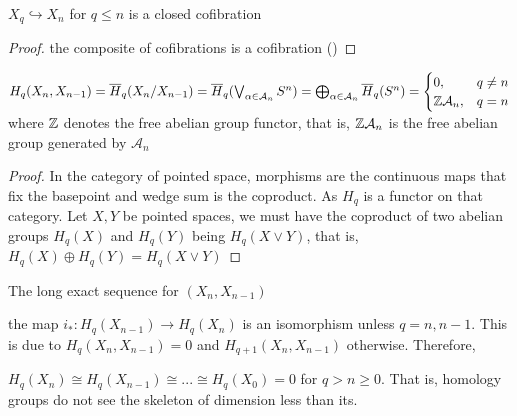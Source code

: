 \documentclass{report}
\begin{document}
\begin{corollary}
    $X_q \hookrightarrow X_n$ for $q \leq n$ is a closed cofibration
\end{corollary}

\begin{proof}
    the composite of cofibrations is a cofibration ()
\end{proof}

\begin{corollary}
    $H_q(X_n, X_{n-1}) = \overline{H}_q(X_n / X_{n-1}) = \overline{H}_q(\bigvee_{\alpha \in \mathcal{A}_n} S^n) = \bigoplus_{\alpha \in \mathcal{A}_n} \overline{H}_q (S^n) = \begin{cases}
        0, &q \neq n \\
        \mathbb{Z} \mathcal{A}_n, &q = n \\
    \end{cases}$
    where $\mathbb{Z}$ denotes the free abelian group functor, that is, $\mathbb{Z} \mathcal{A}_n$ is the free abelian group generated by $\mathcal{A}_n$
\end{corollary}

\begin{proof}
    In the category of pointed space, morphisms are the continuous maps that fix the basepoint and wedge sum is the coproduct. As $H_q$ is a functor on that category. Let $X, Y$ be pointed spaces, we must have the coproduct of two abelian groups $H_q(X)$ and $H_q(Y)$ being $H_q(X \vee Y)$, that is, $H_q(X) \oplus H_q(Y) = H_q(X \vee Y)$
\end{proof}

The long exact sequence for $(X_n, X_{n-1})$ 

\begin{center}
\end{center}

the map $i_*: H_q(X_{n-1}) \to H_q(X_n)$ is an isomorphism unless $q = n, n-1$. This is due to $H_q(X_n, X_{n-1}) = 0$ and $H_{q+1}(X_n, X_{n-1})$ otherwise. Therefore,

\begin{corollary}
    $H_q(X_n) \cong H_q(X_{n-1}) \cong ... \cong H_q(X_0) = 0$ for $q > n \geq 0$. That is, homology groups do not see the skeleton of dimension less than its.   
\end{corollary}
\end{document}
